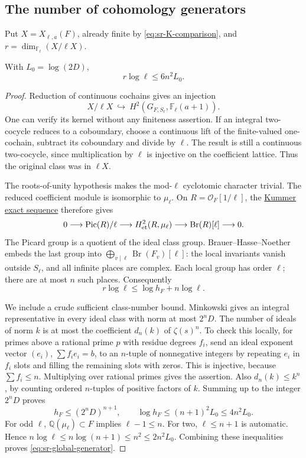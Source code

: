 \subsection{The number of cohomology generators}
Put \(X=X_{\ell,a}(F)\), already finite by
\eqref{eq:sr-K-comparison}, and
\(r=\dim_{\mathbb F_\ell}(X/\ell X)\).

\begin{srlemma}\label{lem:sr-global-generator}
With \(L_0=\log(2D)\),
\begin{equation}\label{eq:sr-global-generator}
                         r\log\ell\leq6n^2L_0 .
\end{equation}
\end{srlemma}
\begin{proof}
Reduction of continuous cochains gives an injection
\[
 X/\ell X\ \hookrightarrow\
                  H^2(G_{F,S_\ell},\mathbb F_\ell(a+1)).
\]
One can verify its kernel without any finiteness assertion.
If an integral two-cocycle reduces to a coboundary, choose a
continuous lift of the finite-valued one-cochain, subtract its
coboundary and divide by \(\ell\).
The result is still a continuous two-cocycle, since multiplication
by \(\ell\) is injective on the coefficient lattice.
Thus the original class was in \(\ell X\).

The roots-of-unity hypothesis makes the mod-\(\ell\) cyclotomic
character trivial. The reduced coefficient module is isomorphic
to \(\mu_\ell\).
On \(R=\mathcal O_F[1/\ell]\), the
\href{https://stacks.math.columbia.edu/tag/03PK}{Kummer exact sequence}
therefore gives
\[
 0\longrightarrow\operatorname{Pic}(R)/\ell
 \longrightarrow H^2_{\rm et}(R,\mu_\ell)
 \longrightarrow\operatorname{Br}(R)[\ell]\longrightarrow0.
\]
The Picard group is a quotient of the ideal class group.
Brauer--Hasse--Noether embeds the last group into
\(\bigoplus_{v\mid\ell}\operatorname{Br}(F_v)[\ell]\):
the local invariants vanish outside \(S_\ell\), and all infinite
places are complex.
Each local group has order \(\ell\); there are at most \(n\)
such places. Consequently
\[
                         r\log\ell\leq\log h_F+n\log\ell.
\]

We include a crude sufficient class-number bound.
Minkowski gives an integral representative in every ideal class
with norm at most \(2^nD\).
The number of ideals of norm \(k\) is at most the coefficient
\(d_n(k)\) of \(\zeta(s)^n\).
To check this locally, for primes above a rational prime \(p\)
with residue degrees \(f_i\), send an ideal exponent vector
\((e_i)\), \(\sum f_ie_i=b\), to an \(n\)-tuple of nonnegative
integers by repeating \(e_i\) in \(f_i\) slots and filling the
remaining slots with zeros. This is injective, because
\(\sum f_i\leq n\).
Multiplying over rational primes gives the assertion.
Also \(d_n(k)\leq k^n\), by counting ordered \(n\)-tuples of positive
factors of \(k\).
Summing up to the integer \(2^nD\) proves
\[
 h_F\leq(2^nD)^{n+1},\qquad
 \log h_F\leq(n+1)^2L_0\leq4n^2L_0.
\]
For odd \(\ell\), \(\mathbb Q(\mu_\ell)\subset F\) implies
\(\ell-1\leq n\). For two, \(\ell\leq n+1\) is automatic.
Hence
\(n\log\ell\leq n\log(n+1)\leq n^2\leq2n^2L_0\).
Combining these inequalities proves
\eqref{eq:sr-global-generator}.
\end{proof}

